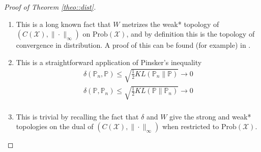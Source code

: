 \documentclass{article} %
\newcommand\PP{\mathbb{P}}
\renewcommand{\d}[1]{\ensuremath{\operatorname{d}\!{#1}}}
\theoremstyle{definition}
\theoremstyle{definition}
\newcommand\manX{\mathcal{X}}
\begin{document}
\begin{appendices}
\begin{proof}[Proof of Theorem \ref{theo::dist}]
\begin{enumerate}
\begin{itemize}
        In the same way, we can define $g_n = \frac{d \PP}{d \PP_m}$, and
        $$2 \PP_m(\{g_n > 3\}) \geq \PP(\{g_n > 3\}) \geq 3 \PP_m(\{g_n > 3\}) $$
        meaning that $\PP_m(\{g_n > 3\}) = 0$ and therefore
        $g_n$ is bounded by 3 almost everywhere for $\PP_n, \PP_m$
        and $\PP$. With the same calculation, $B_n = \{g_n > 1 + \epsilon\}$ and
        $$\PP(B_n) = \int_{B_n} g_n \d \PP_m \geq (1 + \epsilon) \PP_m(B_n) $$
        so $\PP_m(B_n) \leq \frac{1}{\epsilon} \delta(\PP, \PP_m) \to 0$, and therefore
        $\PP(B_n) \to 0$. We can now show
        \begin{align*}
          KL(\PP \| \PP_m) &= \int \log(g_n) \d \PP \\
          &\leq \log(1 + \epsilon) + \int_{B_n} \log (g_n) \d \PP \\
          &\leq \log(1 + \epsilon) + \log(3) \PP(B_n)
        \end{align*}
        so we achieve $ 0 \leq \limsup KL(\PP \| \PP_m) \leq \log(1 + \epsilon)$
        and then $KL(\PP \| \PP_m) \to 0$. Finally, we conclude
        $$JS(\PP_n,\PP) = \frac{1}{2} KL(\PP_n \| \PP_m) + \frac{1}{2} KL(\PP \| \PP_m) \to 0 $$
        
      \item ($JS(\PP_n,\PP) \to 0 \Rightarrow \delta(\PP_n, \PP) \to 0$) \quad --- \quad
        by a simple
        application of the triangular and Pinsker's inequalities we get
        \begin{align*}
          \delta(\PP_n, \PP) &\leq \delta(\PP_n, \PP_m) + \delta(\PP, \PP_m) \\
          &\leq \sqrt{\frac{1}{2} KL(\PP_n \| \PP_m)} + \sqrt{\frac{1}{2} KL(\PP \| \PP_m)} \\
          &\leq 2 \sqrt{JS(\PP_n,\PP)} \to 0
        \end{align*}
      \end{itemize}
    \item
      This is a long known fact that $W$ metrizes
      the weak* topology of $(C(\manX), \|\cdot \|_\infty)$
      on $\text{Prob}(\manX)$, and by definition this
      is the topology of convergence in distribution.
      A proof of this can be found (for example) in \cite{Vil}.
    \item
      This is a straightforward application of Pinsker's inequality
      \begin{align*}
        \delta(\PP_n, \PP) \leq \sqrt{\frac{1}{2} KL(\PP_n \| \PP)} \to 0 \\
        \delta(\PP, \PP_n) \leq \sqrt{\frac{1}{2} KL(\PP \| \PP_n)} \to 0 \\
      \end{align*}
      \vspace{-8mm}
    \item
      This is trivial by recalling the fact that $\delta$ and $W$ give the
      strong and weak* topologies on the dual of $(C(\manX), \|\cdot \|_\infty)$
      when restricted to $\text{Prob}(\manX)$.
  \end{enumerate}
\end{proof}


\end{appendices}
\end{document}
